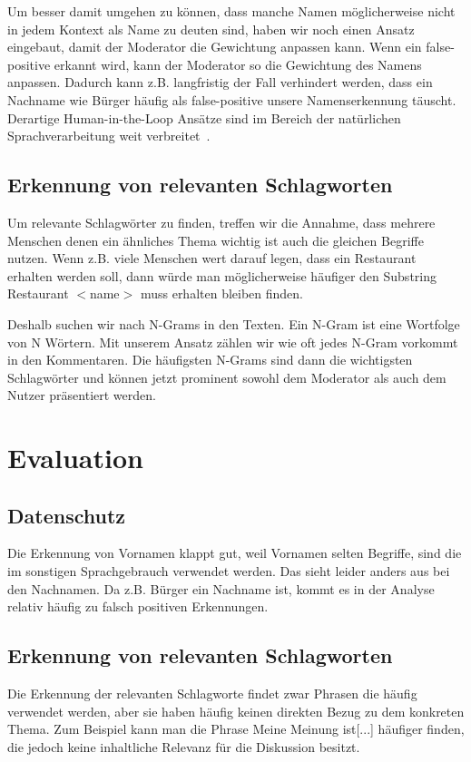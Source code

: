 \documentclass[runningheads]{llncs}
\begin{document}
		Um besser damit umgehen zu können, dass manche Namen möglicherweise nicht in jedem Kontext als Name zu deuten sind, haben wir noch einen Ansatz eingebaut, damit der Moderator die Gewichtung anpassen kann.
		Wenn ein false-positive erkannt wird, kann der Moderator so die Gewichtung des Namens anpassen.
		Dadurch kann z.B. langfristig der Fall verhindert werden, dass ein Nachname wie Bürger häufig als false-positive unsere Namenserkennung täuscht.
		Derartige Human-in-the-Loop Ansätze sind im Bereich der natürlichen Sprachverarbeitung weit verbreitet~\cite{bailey2018few}\cite{gronsund2020augmenting}.
	
	\subsection{Erkennung von relevanten Schlagworten}
		Um relevante Schlagwörter zu finden, treffen wir die Annahme, dass mehrere Menschen denen ein ähnliches Thema wichtig ist auch die gleichen Begriffe nutzen.
		Wenn z.B. viele Menschen wert darauf legen, dass ein Restaurant erhalten werden soll, dann würde man möglicherweise häufiger den Substring \glqq Restaurant $<$name$>$ muss erhalten bleiben\grqq{} finden.
		
		Deshalb suchen wir nach N-Grams in den Texten.
		Ein N-Gram ist eine Wortfolge von N Wörtern.
		Mit unserem Ansatz zählen wir wie oft jedes N-Gram vorkommt in den Kommentaren.
		Die häufigsten N-Grams sind dann die wichtigsten Schlagwörter und können jetzt prominent sowohl dem Moderator als auch dem Nutzer präsentiert werden.

\section{Evaluation}
	\subsection{Datenschutz}
		Die Erkennung von Vornamen klappt gut, weil Vornamen selten Begriffe, sind die im sonstigen Sprachgebrauch verwendet werden.
		Das sieht leider anders aus bei den Nachnamen.
		Da z.B. \glqq Bürger\grqq{} ein Nachname ist, kommt es in der Analyse relativ häufig zu falsch positiven Erkennungen.
	\subsection{Erkennung von relevanten Schlagworten}
		Die Erkennung der relevanten Schlagworte findet zwar Phrasen die häufig verwendet werden, aber sie haben häufig keinen direkten Bezug zu dem konkreten Thema.
		Zum Beispiel kann man die Phrase \glqq Meine Meinung ist[...]\grqq{} häufiger finden,
		die jedoch keine inhaltliche Relevanz für die Diskussion besitzt.
\end{document}
